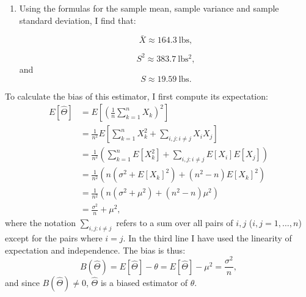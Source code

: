 \begin{problem}{1}$ $
\begin{enumerate}
\item Using the formulas for the sample mean, sample variance and sample standard deviation, I find that:

\begin{equation*}
\bar X \approx 164.3 ~\mathrm{lbs},
\end{equation*}

\begin{equation*}
S^2 \approx 383.7 ~\mathrm{lbs^2},
\end{equation*}
and
\begin{equation*}
S \approx 19.59~ \mathrm{lbs}.
\end{equation*}

\end{enumerate}
\end{problem}

\begin{problem}{2}  To calculate the bias of this estimator, I first compute its expectation:
\begin{align*}
E[\hat \Theta] &= E\left [\left(\frac{1}{n}\sum_{k=1}^n X_k\right)^2 \right ] \\
&= \frac{1}{n^2}E\left [\sum_{k=1}^n X_k^2 +\sum_{i, j: i \neq j} X_iX_j \right] \\
&= \frac{1}{n^2}\left (\sum_{k=1}^n E[X_k^2] +\sum_{i, j: i \neq j} E[X_i]E[X_j] \right) \\
&= \frac{1}{n^2}\left (n(\sigma^2+E[X_k]^2) +(n^2-n) E[X_k]^2 \right) \\
&= \frac{1}{n^2}\left (n(\sigma^2+\mu^2) +(n^2-n) \mu^2 \right) \\
& = \frac{\sigma^2}{n}+\mu^2,
\end{align*}
where the notation $\sum_{i, j: i \neq j}$ refers to a sum over all pairs of $i, j$ ($i, j = 1, \ldots, n$) except for the pairs where $i=j$.  In the third line I have used the linearity of expectation and independence.  The bias is thus:
\begin{equation*}
B(\hat \Theta) = E[\hat \Theta] - \theta = E[\hat \Theta] - \mu^2 = \frac{\sigma^2}{n},
\end{equation*}
and since $B(\hat \Theta) \ne 0$, $\hat \Theta$ is a biased estimator of $\theta$.

\end{problem}


